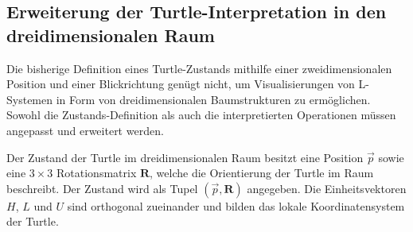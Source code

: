 \subsection{Erweiterung der Turtle-Interpretation in den dreidimensionalen Raum}

Die bisherige Definition eines Turtle-Zustands mithilfe einer zweidimensionalen Position und einer Blickrichtung genügt nicht, um Visualisierungen von L-Systemen in Form von dreidimensionalen Baumstrukturen zu ermöglichen. Sowohl die Zustands-Definition als auch die interpretierten Operationen müssen angepasst und erweitert werden.

Der Zustand der Turtle im dreidimensionalen Raum besitzt eine Position $\overrightarrow{p}$ sowie eine $3\times3$ Rotationsmatrix $\boldsymbol{R}$, welche die Orientierung der Turtle im Raum beschreibt. Der Zustand wird als Tupel $(\overrightarrow{p}, \boldsymbol{R})$ angegeben. Die Einheitsvektoren $H$, $L$ und $U$  sind orthogonal zueinander und bilden das lokale Koordinatensystem der Turtle. 

